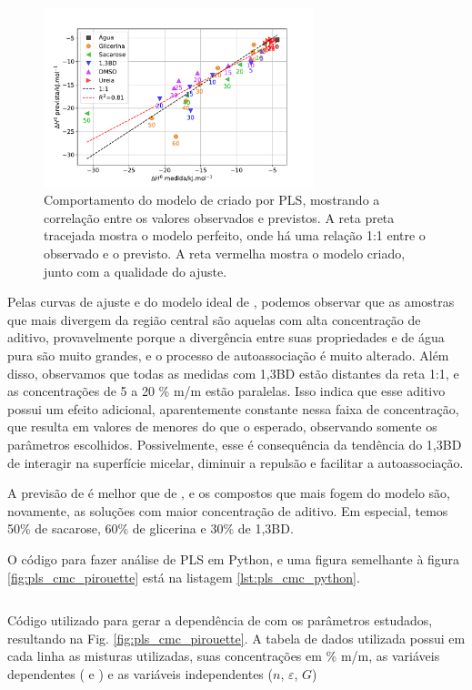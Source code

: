 		\begin{figure}[h]
			\centering
			\includegraphics[width=0.7\textwidth]{imagens/itc/PLS_dh_pirouette}
			\caption{Comportamento do modelo de \DHmic{} criado por PLS, mostrando a correlação entre os valores observados e previstos. A reta preta tracejada mostra o modelo perfeito, onde há uma relação 1:1 entre o observado e o previsto. A reta vermelha mostra o modelo criado, junto com a qualidade do ajuste.}
			\label{fig:pls_dh_pirouette}
		\end{figure} 
		
		Pelas curvas de ajuste e do modelo ideal de \cmc, podemos observar que as amostras que mais divergem da região central são aquelas com alta concentração de aditivo, provavelmente porque a divergência entre suas propriedades e de água pura são muito grandes, e o processo de autoassociação é muito alterado. Além disso, observamos que todas as medidas com 1,3BD estão distantes da reta 1:1, e as concentrações de 5 a 20 \% m/m estão paralelas. Isso indica que esse aditivo possui um efeito adicional, aparentemente constante nessa faixa de concentração, que resulta em valores de \cmc{} menores do que o esperado, observando somente os parâmetros escolhidos. Possivelmente, esse é consequência da tendência do 1,3BD de interagir na superfície micelar, diminuir a repulsão e facilitar a autoassociação.
		
		A previsão de \DHmic{} é melhor que de \cmc, e os compostos que mais fogem do modelo são, novamente, as soluções com maior concentração de aditivo. Em especial, temos 50\% de sacarose, 60\% de glicerina e 30\% de 1,3BD.
		
		O código para fazer análise de PLS em Python, e uma figura semelhante à figura \ref{fig:pls_cmc_pirouette} está na listagem \ref{lst:pls_cmc_python}.
		
		\begin{listing}[h]
			\inputminted{python}{./python/pls_cmc_sklearn.py}
			\caption{Código utilizado para gerar a dependência de \cmc{} com os parâmetros estudados, resultando na Fig. \ref{fig:pls_cmc_pirouette}. A tabela de dados utilizada possui em cada linha as misturas utilizadas, suas concentrações em \% m/m, as variáveis dependentes (\cmc{} e \DHmic) e as variáveis independentes (\(n\), \(\varepsilon\), \(G\))}
			\label{lst:pls_cmc_python}
		\end{listing}
		
